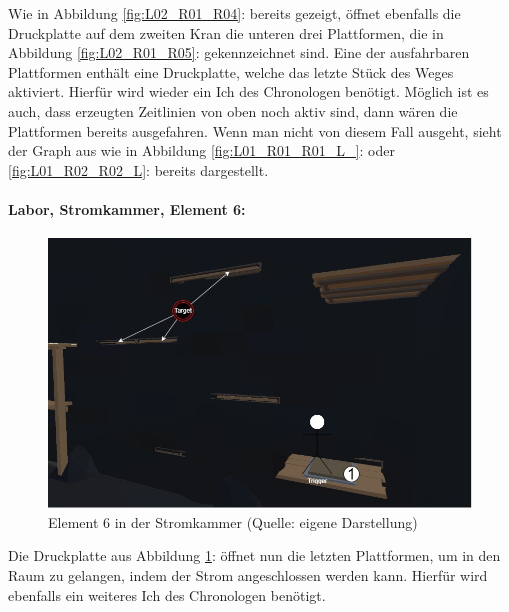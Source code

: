 Wie in Abbildung \ref{fig:L02_R01_R04}:  bereits gezeigt, öffnet ebenfalls die Druckplatte auf dem zweiten Kran die unteren drei Plattformen, die in Abbildung \ref{fig:L02_R01_R05}:  gekennzeichnet sind. Eine der ausfahrbaren Plattformen enthält eine Druckplatte, welche das letzte Stück des Weges aktiviert. Hierfür wird wieder ein Ich des Chronologen benötigt. Möglich ist es auch, dass erzeugten Zeitlinien von oben noch aktiv sind, dann wären die Plattformen bereits ausgefahren. Wenn man nicht von diesem Fall ausgeht, sieht der Graph aus wie in Abbildung \ref{fig:L01_R01_R01_L_}:  oder \ref{fig:L01_R02_R02_L}:  bereits dargestellt.

\paragraph{Labor, Stromkammer, Element 6:}\label{p:lse6}

\begin{figure}[ht]
\centering
\includegraphics[width=0.8\linewidth]{content/pictures/Raetsel-L02_R01_R06.jpg}
\caption{Element 6 in der Stromkammer (Quelle: eigene Darstellung)}
\label{fig:L02_R01_R06}
\end{figure}

Die Druckplatte aus Abbildung \ref{fig:L02_R01_R06}:  öffnet nun die letzten Plattformen, um in den Raum zu gelangen, indem der Strom angeschlossen werden kann. Hierfür wird ebenfalls ein weiteres Ich des Chronologen benötigt.

